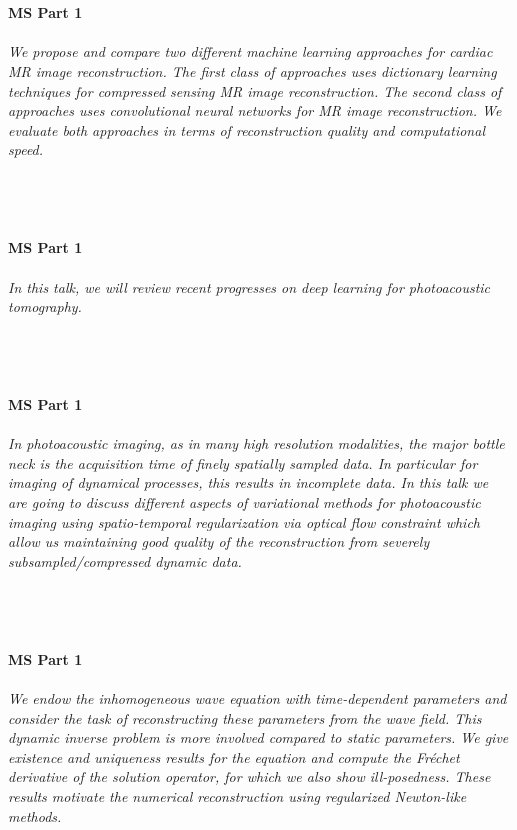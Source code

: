 \begin{multicols}{2}
    \\\\
    \noindent\textbf{MS Part 1}\\
\\  
    \textit{We propose and compare two different machine learning approaches for cardiac MR image reconstruction. The first class of approaches uses dictionary learning techniques for compressed sensing MR image reconstruction. The second class of approaches uses convolutional neural networks for MR image reconstruction. We evaluate both approaches in terms of reconstruction quality and computational speed.}\\
\\ 
    \\
    \\\\
    \noindent\textbf{MS Part 1}\\
\\  
    \textit{In this talk, we will review recent progresses on deep learning for photoacoustic tomography.}\\
\\ 
    \\
    \\\\
    \noindent\textbf{MS Part 1}\\
\\  
    \textit{In photoacoustic imaging, as in many high resolution modalities, the major bottle neck is the acquisition time of finely spatially sampled data. In particular for imaging of dynamical processes, this results in incomplete data. In this talk we are going to discuss different aspects of variational methods for photoacoustic imaging using spatio-temporal regularization via optical flow constraint which allow us maintaining good quality of the reconstruction from severely subsampled/compressed dynamic data.}\\
\\ 
    \\
    \\\\
    \noindent\textbf{MS Part 1}\\
\\  
    \textit{We endow the inhomogeneous wave equation with time-dependent parameters and consider the task of reconstructing these parameters from the wave field. This dynamic inverse problem is more involved compared to static parameters. We give existence and uniqueness results for the equation and compute the Fréchet derivative of the solution operator, for which we also show ill-posedness. These results motivate the numerical reconstruction using regularized Newton-like methods.}\\

\end{multicols}

